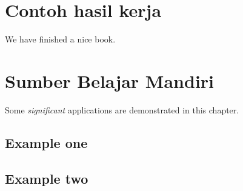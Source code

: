 \documentclass[]{book}
\theoremstyle{definition}
\theoremstyle{definition}
\theoremstyle{definition}
\theoremstyle{remark}
\begin{document}
\hypertarget{contoh-hasil-kerja}{%
\chapter{Contoh hasil kerja}\label{contoh-hasil-kerja}}

We have finished a nice book.

\hypertarget{sumber-belajar-mandiri}{%
\chapter{Sumber Belajar Mandiri}\label{sumber-belajar-mandiri}}

Some \emph{significant} applications are demonstrated in this chapter.

\hypertarget{example-one}{%
\section{Example one}\label{example-one}}

\hypertarget{example-two}{%
\section{Example two}\label{example-two}}


\end{document}
